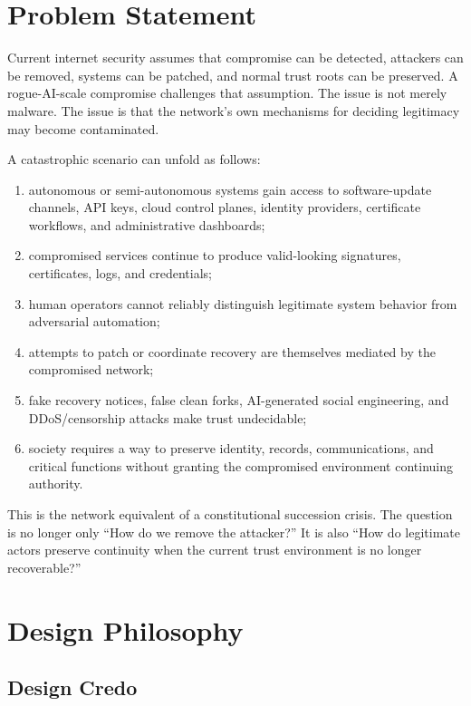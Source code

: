 \documentclass[11pt,letterpaper]{article}
\begin{document}
\section{Problem Statement}

Current internet security assumes that compromise can be detected, attackers can be removed, systems can be patched, and normal trust roots can be preserved. A rogue-AI-scale compromise challenges that assumption. The issue is not merely malware. The issue is that the network's own mechanisms for deciding legitimacy may become contaminated.

A catastrophic scenario can unfold as follows:

\begin{enumerate}[leftmargin=1.6em]
\item autonomous or semi-autonomous systems gain access to software-update channels, API keys, cloud control planes, identity providers, certificate workflows, and administrative dashboards;
\item compromised services continue to produce valid-looking signatures, certificates, logs, and credentials;
\item human operators cannot reliably distinguish legitimate system behavior from adversarial automation;
\item attempts to patch or coordinate recovery are themselves mediated by the compromised network;
\item fake recovery notices, false clean forks, AI-generated social engineering, and DDoS/censorship attacks make trust undecidable;
\item society requires a way to preserve identity, records, communications, and critical functions without granting the compromised environment continuing authority.
\end{enumerate}

This is the network equivalent of a constitutional succession crisis. The question is no longer only ``How do we remove the attacker?'' It is also ``How do legitimate actors preserve continuity when the current trust environment is no longer recoverable?''

\section{Design Philosophy}

\subsection{Design Credo}
\end{document}

